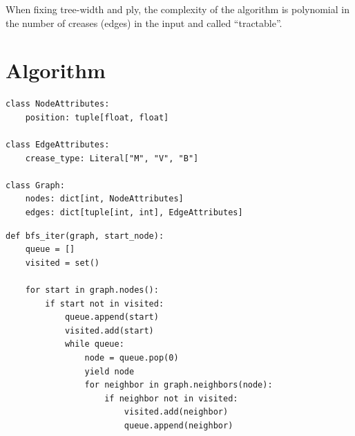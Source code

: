 When fixing tree-width and ply, the complexity of the algorithm is polynomial in the number of creases (edges) in the input and called ``tractable''.


\chapter{Algorithm}

\begin{lstlisting}
class NodeAttributes:
    position: tuple[float, float]

class EdgeAttributes:
    crease_type: Literal["M", "V", "B"]

class Graph:
    nodes: dict[int, NodeAttributes]
    edges: dict[tuple[int, int], EdgeAttributes]
\end{lstlisting}

\begin{lstlisting}
def bfs_iter(graph, start_node):
    queue = []
    visited = set()

    for start in graph.nodes():
        if start not in visited:
            queue.append(start)
            visited.add(start)
            while queue:
                node = queue.pop(0)
                yield node
                for neighbor in graph.neighbors(node):
                    if neighbor not in visited:
                        visited.add(neighbor)
                        queue.append(neighbor)
\end{lstlisting}






